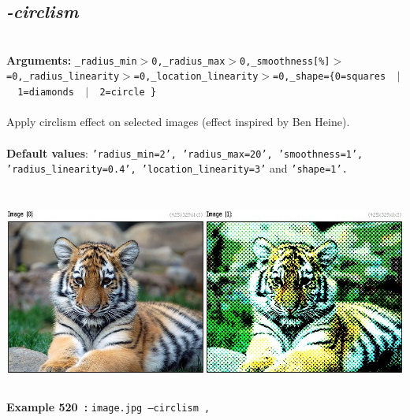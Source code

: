 \documentclass[a4paper,11pt,twoside]{book}
\begin{document}
\subsection{\emph{-circlism} }\vspace*{-0.5em}
~\\\textbf{Arguments: } 
{\small \texttt{\_radius\_min$>$0,\_radius\_max$>$0,\_smoothness[\%]$>$=0,\_radius\_linearity$>$=0,\_location\_linearity$>$=0,\_shape=\{0=squares ~$|$~ 1=diamonds ~$|$~ 2=circle \}}}\\~\\
Apply circlism effect on selected images (effect inspired by Ben Heine).
~\\~\\\textbf{Default values}: {\small \texttt{'radius\_min=2', 'radius\_max=20', 'smoothness=1', 'radius\_linearity=0.4', 'location\_linearity=3'} and \texttt{'shape=1'.}}
\begin{center}\includegraphics[keepaspectratio=true,height=7cm,width=\textwidth]{img/gmic_def520.jpg}\\
{\footnotesize \textbf{Example 520~:} \texttt{image.jpg --circlism ,}}
\end{center}
\end{document}
